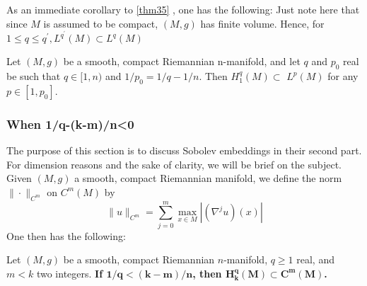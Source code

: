 \documentclass[12pt,hyperref,a4paper,UTF8]{ctexart}
\begin{document}
\vskip 3pt
As an immediate corollary to \autoref{thm35} , one has the following: Just note here that since $M$ is assumed to be compact, $(M, g)$ has finite volume. Hence, for $1 \leq q \leq q^{\prime}, L^{q^{\prime}}(M) \subset L^q(M)$

\begin{Corollary}
    Let $(M, g)$ be a smooth, compact Riemannian n-manifold, and let $q$ and $p_0$ real be such that $q \in[1, n)$ and $1 / p_0=1 / q-1 / n$. Then $H_1^q(M) \subset$ $L^p(M)$ for any $p \in\left[1, p_0\right]$.
\label{cor31}
\end{Corollary}

\subsubsection{When 1/q-(k-m)/n<0}

The purpose of this section is to discuss Sobolev embeddings in their second part. For dimension reasons and the sake of clarity, we will be brief on the subject.
Given $(M, g)$ a smooth, compact Riemannian manifold, we define the norm $\|\cdot\|_{C^m}$ on $C^m(M)$ by
$$
\|u\|_{C^m}=\sum_{j=0}^m \max _{x \in M}\left|\left(\nabla^j u\right)(x)\right|
$$
One then has the following:
\begin{Theorem}
    Let $(M, g)$ be a smooth, compact Riemannian ${n}$-manifold, ${q \geq 1}$ real, and ${m<k}$ two integers. \textbf{If $\bm{1 / q<(k-m) / n}$, then $\bm{H_k^q(M) \subset C^m(M)}$.}
\label{thm36}
\end{Theorem}
\end{document}
